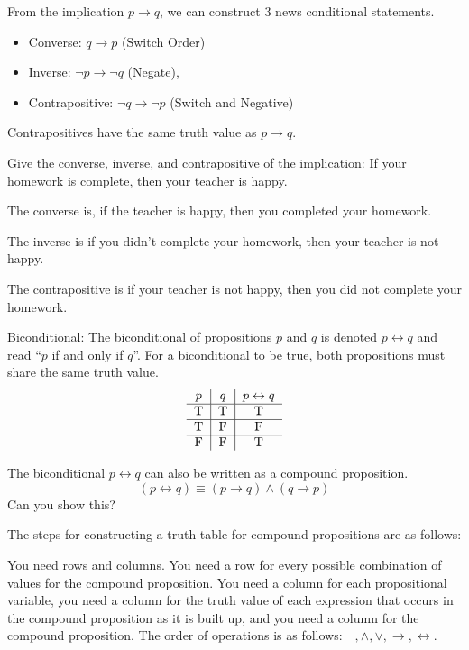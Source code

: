 \documentclass[../discrete.tex]{subfiles}
\begin{document}
From the implication $p\rightarrow q$, we can construct 3 news conditional statements.
\begin{itemize}
    \item Converse: $q\rightarrow p$ (Switch Order)
    \item Inverse: $\neg p\rightarrow \neg q$ (Negate),
    \item Contrapositive: $\neg q\rightarrow \neg p$ (Switch and Negative)
\end{itemize}
Contrapositives have the same truth value as $p\rightarrow q$.

\begin{example}
    Give the converse, inverse, and contrapositive of the implication: If your homework is complete, then your teacher is happy.

    The converse is, if the teacher is happy, then you completed your homework.

    The inverse is if you didn't complete your homework, then your teacher is not happy.

    The contrapositive is if your teacher is not happy, then you did not complete your homework.
\end{example}

Biconditional: The biconditional of propositions $p$ and $q$ is denoted $p\leftrightarrow q$ and read ``$p$ if and only if $q$''. 
For a biconditional to be true, both propositions must share the same truth value.
\[ \begin{tabular}{c|c|c}
    $p$ & $q$ & $p\leftrightarrow q$\\\hline
    T & T & T\\\hline
    T&F&F\\\hline
    F&F&T
\end{tabular}\]

The biconditional $p\leftrightarrow q$ can also be written as a compound proposition.
\[ (p\leftrightarrow q)\equiv (p\rightarrow q)\land (q\rightarrow p) \]
Can you show this?

The steps for constructing a truth table for compound propositions are as follows:

You need rows and columns. You need a row for every possible combination of values for the compound proposition. You need a column for each propositional variable, you need a column for the truth value of each expression that occurs in the compound proposition as it is built up, and you need a column for the compound proposition. The order of operations is as follows: $\neg, \land,\lor,\rightarrow,\leftrightarrow$.
\end{document}

